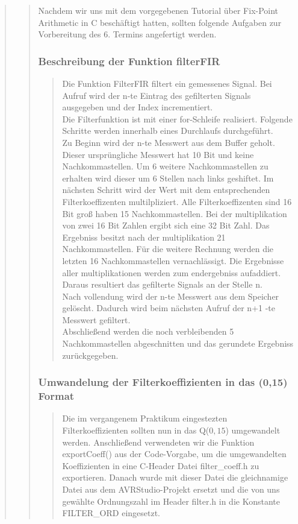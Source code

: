\begin{quote}
\begin{quote}
    	Nachdem wir uns mit dem vorgegebenen Tutorial über Fix-Point Arithmetic in
    	C beschäftigt hatten, sollten folgende Aufgaben zur Vorbereitung des 6.
    	Termins angefertigt werden.
    	
    	\subsubsection{Beschreibung der Funktion filterFIR}
    	\begin{quote}
    	
    	Die Funktion FilterFIR filtert ein gemessenes Signal. Bei Aufruf wird der n-te Eintrag des gefilterten Signals
    	ausgegeben und der Index incrementiert.\\
    	Die Filterfunktion ist mit einer for-Schleife realisiert. Folgende Schritte werden innerhalb eines Durchlaufs
    	durchgeführt.\\
    	Zu Beginn wird der n-te Messwert aus dem Buffer geholt. Dieser ursprüngliche Messwert hat 10 Bit und keine
    	Nachkommastellen. Um 6 weitere Nachkommastellen zu erhalten wird dieser um 6 Stellen nach links geshiftet. Im
        nächsten Schritt wird der Wert mit dem entsprechenden Filterkoeffizenten multilpliziert. Alle Filterkoeffizenten
        sind 16 Bit groß haben 15 Nachkommastellen. Bei der multiplikation von zwei 16 Bit Zahlen ergibt sich eine 32
        Bit Zahl. Das Ergebniss besitzt nach der multiplikation 21 Nachkommastellen. Für die weitere Rechnung werden die
        letzten 16 Nachkommastellen vernachlässigt. Die Ergebnisse aller multiplikationen werden zum endergebniss
        aufaddiert. Daraus resultiert das gefilterte Signals an der Stelle n.\\
        Nach vollendung wird der n-te Messwert aus dem Speicher gelöscht. Dadurch wird beim nächsten Aufruf der n+1 -te
        Messwert gefiltert.\\
        Abschließend werden die noch verbleibenden 5 Nachkommastellen abgeschnitten und das gerundete Ergebniss
        zurückgegeben.
        
		\end{quote}
		
		\subsubsection{Umwandelung der Filterkoeffizienten in das (0,15) Format}
		\begin{quote}
		
		Die im vergangenem Praktikum eingestezten Filterkoeffizienten sollten nun in
		das Q($0,15$) umgewandelt werden. 
		Anschließend verwendeten wir die Funktion exportCoeff() aus der Code-Vorgabe,
		um die umgewandelten Koeffizienten in eine C-Header Datei filter_coeff.h zu
		exportieren. Danach wurde mit dieser Datei die gleichnamige Datei aus dem
		AVRStudio-Projekt ersetzt und die von uns gewählte Ordnungszahl im Header
		filter.h in die Konstante FILTER_ORD eingesetzt. 
		

\end{quote}
\end{quote}
\end{quote}
